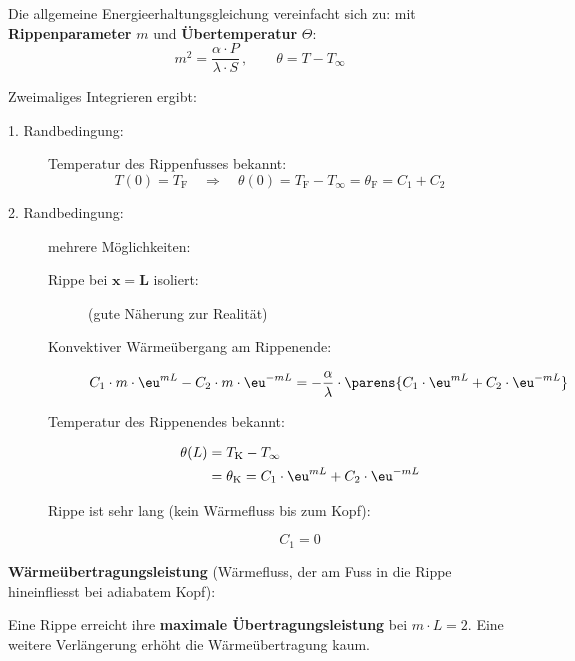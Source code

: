 			Die allgemeine Energieerhaltungsgleichung vereinfacht sich zu:
			mit \textbf{Rippenparameter} $m$ und \textbf{Übertemperatur} $\Theta$:
			\[
				m^2 = \frac{\alpha \cdot P}{\lambda \cdot S}
				\,,\qquad
				\theta = T - T_\infty
			\]

			Zweimaliges Integrieren ergibt:

			\begin{description}
				\item[1. Randbedingung:] Temperatur des Rippenfusses bekannt:
					\[
						T(0) = T_\text{F} \quad \Rightarrow \quad \theta(0) = T_\text{F} - T_\infty = \theta_\text{F} = C_1 + C_2
					\]
				\item[2. Randbedingung:] mehrere Möglichkeiten:
					\begin{description}
						\item[Rippe bei $\boldsymbol{x = L}$ isoliert:] (gute Näherung zur Realität)
						\item[Konvektiver Wärmeübergang am Rippenende:]
							\[
								C_1 \cdot m \cdot \eu^{mL} - C_2 \cdot m \cdot \eu^{-mL} = - \frac{\alpha}{\lambda} \cdot \parens{C_1 \cdot \eu^{mL} + C_2 \cdot \eu^{-mL}}
							\]
						\item[Temperatur des Rippenendes bekannt:]
							\begin{align*}
								\theta(L) &= T_\text{K} - T_\infty \\
								&= \theta_\text{K} = C_1 \cdot \eu^{mL} + C_2 \cdot \eu^{-mL}
							\end{align*}
						\item[Rippe ist sehr lang (kein Wärmefluss bis zum Kopf):]
							\[
								C_1 = 0
							\]
					\end{description}
			\end{description}

			\textbf{Wärmeübertragungsleistung} (Wärmefluss, der am Fuss in die Rippe hineinfliesst bei adiabatem Kopf):

			Eine Rippe erreicht ihre \textbf{maximale Übertragungsleistung} bei $m\cdot L = 2$. Eine weitere Verlängerung erhöht die Wärme\-über\-tragung kaum.

